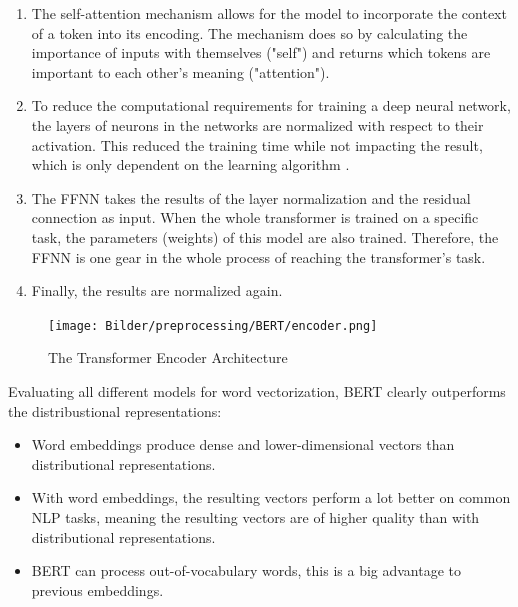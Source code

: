                \begin{enumerate}
               	\item The self-attention mechanism allows for the model to incorporate the context of a token into its encoding. The mechanism does so by calculating the importance of inputs with themselves ("self") and returns which tokens are important to each other's meaning ("attention").
               	\item To reduce the computational requirements for training a deep neural network, the layers of neurons in the networks are normalized with respect to their activation. This reduced the training time while not impacting the result, which is only dependent on the learning algorithm \cite{baLayerNormalization2016}.
               	\item The \ac{FFNN} takes the results of the layer normalization and the residual connection as input. When the whole transformer is trained on a specific task, the parameters (weights) of this model are also trained. Therefore, the \ac{FFNN} is one gear in the whole process of reaching the transformer's task.
               	\item Finally, the results are normalized again.
               \end{enumerate}
       			
       			 \begin{figure}[h!]
       				\label{fig:encoder}
       				\centering
       				\texttt{[image: Bilder/preprocessing/BERT/encoder.png]}
       				\caption{The Transformer Encoder Architecture  \cite{illustratedTransformer}}
       			\end{figure}
			
            
            Evaluating all different models for word vectorization, BERT clearly outperforms the distribustional representations:
            \begin{itemize}
            	\item Word embeddings produce dense and lower-dimensional vectors than distributional representations.
            	\item With word embeddings, the resulting vectors perform a lot better on common \ac{NLP} tasks, meaning the resulting vectors are of higher quality than with distributional representations.
            	\item BERT can process out-of-vocabulary words, this is a big advantage to previous embeddings.
            \end{itemize}

